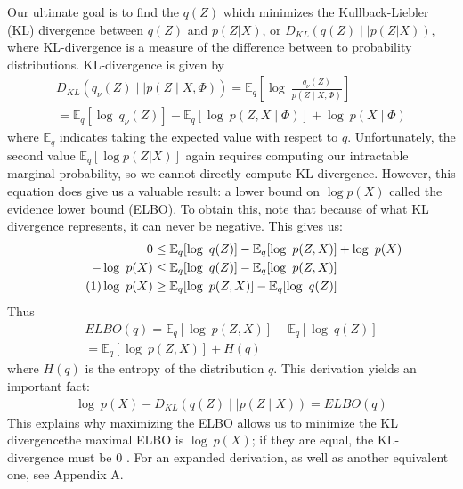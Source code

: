 \documentclass[12pt,letterpaper]{article}
\newcommand\numberthis{\addtocounter{equation}{1}\tag{\theequation}}
\begin{document}
Our ultimate goal is to find the $q(Z)$ which minimizes the Kullback-Liebler (KL) divergence between $q(Z)$ and $p(Z|X)$, or $D_{KL}(q(Z) \mid \mid p(Z|X))$, where KL-divergence is a measure of the difference between to probability distributions. KL-divergence is given by 
\begin{align}
  \nonumber D_{KL}(q_\nu (Z) \mid \mid  p(Z\mid X,\Phi)) = \mathbb{E}_q[\log\ \frac{q_\nu(Z)}{p(Z\mid X,\Phi)}] \\
 =  \mathbb{E}_q [\log\ q_\nu(Z)] - \mathbb{E}_q [\log\ p(Z,X\mid \Phi)] + \log\ p(X\mid \Phi) 
\end{align}
 where $\mathbb{E}_q$ indicates taking the expected value with respect to $q$. Unfortunately, the second value $\mathbb{E}_q[\log p(Z|X)]$ again requires computing our intractable marginal probability, so we cannot directly compute KL divergence. However, this equation does give us a valuable result: a lower bound on $\log p(X)$ called the evidence lower bound (ELBO). To obtain this, note that because of what KL divergence represents, it can never be negative. This gives us: 
\begin{align*}
\nonumber 0 &\leq \mathbb{E}_q [\log\ q(Z)] - \mathbb{E}_q [\log\ p(Z,X)] + \log\ p(X)\\
\nonumber - \log\ p(X) &\leq \mathbb{E}_q [\log\ q(Z)] - \mathbb{E}_q [\log\ p(Z,X)]  \\
\numberthis\log\ p(X) &\geq \mathbb{E}_q [\log\ p(Z,X)] - \mathbb{E}_q [\log\ q(Z)] 
\end{align*}
Thus \begin{align}ELBO(q) =  \mathbb{E}_q [\log\ p(Z,X)] - \mathbb{E}_q [\log\ q(Z)] \\
= \mathbb{E}_q [\log\ p(Z,X)] + H(q) \end{align} where $H(q)$ is the entropy of the distribution $q$.
This derivation yields an important fact: 
\begin{align}
\log\ p(X) - D_{KL}(q(Z) \mid \mid  p(Z\mid X)) = ELBO(q)
\end{align}
This explains why maximizing the ELBO allows us to minimize the KL divergence\textemdash the maximal ELBO is $\log\ p(X)$; if they are equal, the KL-divergence must be 0 \citep{blei:2017}. For an expanded derivation, as well as another equivalent one, see Appendix A. 
\end{document}
